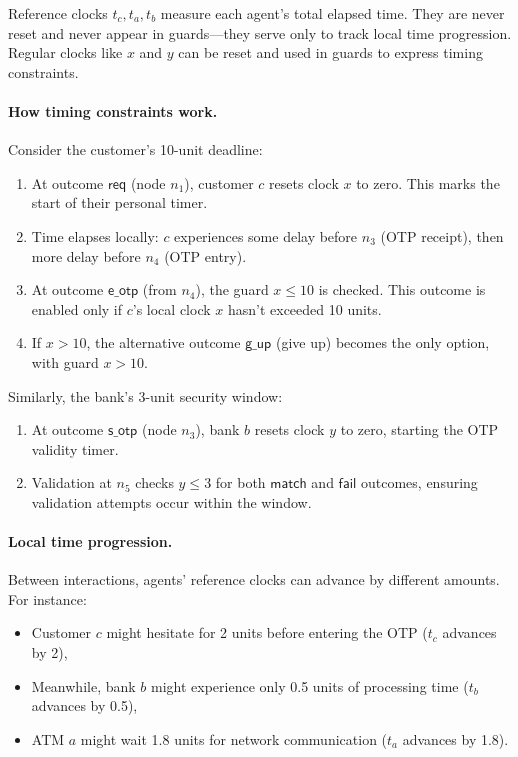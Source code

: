 Reference clocks $t_c, t_a, t_b$ measure each agent's total elapsed time. They are never reset and never appear in guards—they serve only to track local time progression. Regular clocks like $x$ and $y$ can be reset and used in guards to express timing constraints.

\paragraph{How timing constraints work.} Consider the customer's 10-unit deadline:
\begin{enumerate}
\item At outcome $\mathsf{req}$ (node $n_1$), customer $c$ resets clock $x$ to zero. This marks the start of their personal timer.
\item Time elapses locally: $c$ experiences some delay before $n_3$ (OTP receipt), then more delay before $n_4$ (OTP entry).
\item At outcome $\mathsf{e\_otp}$ (from $n_4$), the guard $x \leq 10$ is checked. This outcome is enabled only if $c$'s local clock $x$ hasn't exceeded 10 units.
\item If $x > 10$, the alternative outcome $\mathsf{g\_up}$ (give up) becomes the only option, with guard $x > 10$.
\end{enumerate}

Similarly, the bank's 3-unit security window:
\begin{enumerate}
\item At outcome $\mathsf{s\_otp}$ (node $n_3$), bank $b$ resets clock $y$ to zero, starting the OTP validity timer.
\item Validation at $n_5$ checks $y \leq 3$ for both $\mathsf{match}$ and $\mathsf{fail}$ outcomes, ensuring validation attempts occur within the window.
\end{enumerate}

\paragraph{Local time progression.} Between interactions, agents' reference clocks can advance by different amounts. For instance:
\begin{itemize}
\item Customer $c$ might hesitate for 2 units before entering the OTP ($t_c$ advances by 2),
\item Meanwhile, bank $b$ might experience only 0.5 units of processing time ($t_b$ advances by 0.5),
\item ATM $a$ might wait 1.8 units for network communication ($t_a$ advances by 1.8).
\end{itemize}

